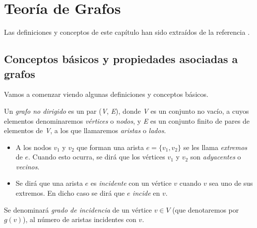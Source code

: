 
\chapter{Teoría de Grafos}\label{ch:segundo-capitulo}
Las definiciones y conceptos de este capítulo han sido extraídos de la referencia \cite{algorithms}.

\section{Conceptos básicos y propiedades asociadas a grafos}
Vamos a comenzar viendo algunas definiciones y conceptos básicos.

\begin{definicion}
	Un \textit{grafo no  dirigido} es un par (\textit{V}, \textit{E}), donde \textit{V} es un conjunto no vacío, a cuyos elementos denominaremos \textit{vértices} o \textit{nodos}, y \textit{E} es un conjunto finito de pares de elementos de \textit{V}, a los que llamaremos \textit{aristas} o \textit{lados}.
\end{definicion}

\begin{itemize}
	\item A los nodos $v_1$ y $v_2$ que forman una arista $e=\{v_1, v_2\}$ se les llama \textit{extremos} de $e$. Cuando esto ocurra, se dirá que los vértices $v_1$ y $v_2$ son \textit{adyacentes} o \textit{vecinos}.
	
	\item Se dirá que una arista $e$ es \textit{incidente} con un vértice $v$ cuando $v$ sea uno de sus extremos. En dicho caso se dirá que $e$ \textit{incide} en $v$.
\end{itemize}

\begin{definicion}
	Se denominará \textit{grado de incidencia} de un vértice $v\in V$ (que denotaremos por $g(v)$), al número de aristas incidentes con $v$.
\end{definicion}

